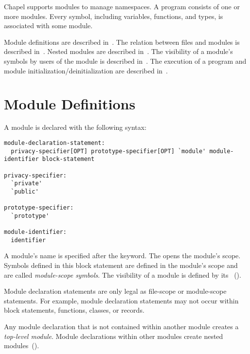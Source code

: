 \label{Modules}

Chapel supports modules to manage namespaces.  A program consists of
one or more modules.  Every symbol, including variables, functions,
and types, is associated with some module.

Module definitions are described in~.  The
relation between files and modules is described
in~.  Nested modules are described
in~.  The visibility of a module's symbols by
users of the module is described in~.  The execution
of a program and module initialization/deinitialization are described
in~.

\section{Module Definitions}
\label{Module_Definitions}

A module is declared with the following syntax:
\begin{syntax}
\begin{verbatim}
module-declaration-statement:
  privacy-specifier[OPT] prototype-specifier[OPT] `module' module-identifier block-statement

privacy-specifier:
  `private'
  `public'

prototype-specifier:
  `prototype'

module-identifier:
  identifier
\end{verbatim}
\end{syntax}

A module's name is specified after the  keyword.
The  opens the module's scope.  Symbols defined
in this block statement are defined in the module's scope and are
called \emph{module-scope symbols}.  The visibility of a module is
defined by its ~().

Module declaration statements are only legal as file-scope or
module-scope statements.  For example, module declaration statements
may not occur within block statements, functions, classes, or records.

Any module declaration that is not contained within another module
creates a \emph{top-level module}.  Module declarations within other
modules create nested modules~().

